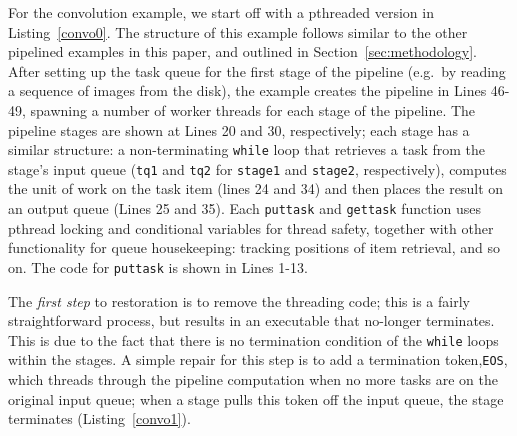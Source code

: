 \noindent
For the convolution example, we start off with a pthreaded version in Listing~\ref{convo0}. The structure of this example follows similar to the other pipelined examples in this paper, and outlined in Section~\ref{sec:methodology}. After setting up the task queue for the first stage of the pipeline (e.g.~by reading a sequence of images from the disk), the example creates the pipeline in Lines 46-49, spawning a number of worker threads for each stage of the pipeline. The pipeline stages are shown at Lines 20 and 30, respectively; each stage has a similar structure: a non-terminating \lstinline{while} loop that retrieves a task from the stage's input queue (\lstinline{tq1} and \lstinline{tq2} for \lstinline{stage1} and \lstinline{stage2}, respectively), computes the unit of work on the task item (lines 24 and 34) and then places the result on an output queue (Lines 25 and 35). Each \lstinline{puttask} and \lstinline{gettask} function uses pthread locking and conditional variables for thread safety, together with other functionality for queue housekeeping: tracking positions of item retrieval, and so on. The code for \lstinline{puttask} is shown in Lines 1-13.

The \emph{first step} to restoration is to remove the threading code; this is a fairly straightforward process, but results in an executable that no-longer terminates. This is due to the fact that there is no termination condition of the \lstinline{while} loops within the stages. A simple repair for this step is to add a termination token,\lstinline{EOS}, which threads through the pipeline computation when no more tasks are on the original input queue; when a stage pulls this token off the input queue, the stage terminates (Listing~\ref{convo1}). 

